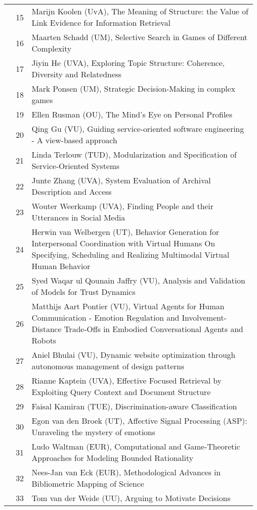 \begin{longtabu}{@{}l@{ }l@{\hspace{1em}}X}
	&	 15	&	 Marijn Koolen (UvA), The Meaning of Structure: the Value of Link Evidence for Information Retrieval\\
	&	 16	&	 Maarten Schadd (UM), Selective Search in Games of Different Complexity\\
	&	 17	&	 Jiyin He (UVA), Exploring Topic Structure: Coherence, Diversity and Relatedness\\
	&	 18	&	 Mark Ponsen (UM), Strategic Decision-Making in complex games\\
	&	 19	&	 Ellen Rusman (OU), The Mind's Eye on Personal Profiles\\
	&	 20	&	 Qing Gu (VU), Guiding service-oriented software engineering - A view-based approach\\
	&	 21	&	 Linda Terlouw (TUD), Modularization and Specification of Service-Oriented Systems\\
	&	 22	&	 Junte Zhang (UVA), System Evaluation of Archival Description and Access\\
	&	 23	&	 Wouter Weerkamp (UVA), Finding People and their Utterances in Social Media\\
	&	 24	&	 Herwin van Welbergen (UT), Behavior Generation for Interpersonal Coordination with Virtual Humans On Specifying, Scheduling and Realizing Multimodal Virtual Human Behavior\\
	&	 25	&	 Syed Waqar ul Qounain Jaffry (VU), Analysis and Validation of Models for Trust Dynamics\\
	&	 26	&	 Matthijs Aart Pontier (VU), Virtual Agents for Human Communication - Emotion Regulation and Involvement-Distance Trade-Offs in Embodied Conversational Agents and Robots\\
	&	 27	&	 Aniel Bhulai (VU), Dynamic website optimization through autonomous management of design patterns\\
	&	 28	&	 Rianne Kaptein (UVA), Effective Focused Retrieval by Exploiting Query Context and Document Structure\\
	&	 29	&	 Faisal Kamiran (TUE), Discrimination-aware Classification\\
	&	 30	&	 Egon van den Broek (UT), Affective Signal Processing (ASP): Unraveling the mystery of emotions\\
	&	 31	&	 Ludo Waltman (EUR), Computational and Game-Theoretic Approaches for Modeling Bounded Rationality\\
	&	 32	&	 Nees-Jan van Eck (EUR), Methodological Advances in Bibliometric Mapping of Science\\
	&	 33	&	 Tom van der Weide (UU), Arguing to Motivate Decisions\\

\end{longtabu}
